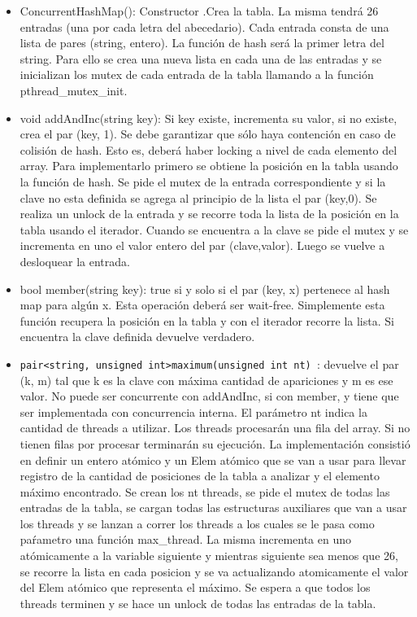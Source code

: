 \documentclass[a4paper]{article}
\begin{document}
{\begin{itemize}

\item ConcurrentHashMap(): Constructor .Crea la tabla. La misma tendrá 26 entradas (una por
cada letra del abecedario). Cada entrada consta de una lista de pares (string, entero). La
función de hash será la primer letra del string. Para ello se crea una nueva lista en cada una de las entradas y se inicializan los mutex de cada entrada de la tabla llamando a la función pthread_mutex_init.\blindtext
\item void addAndInc(string key): Si key existe, incrementa su valor, si no existe, crea el par
(key, 1). Se debe garantizar que sólo haya contención en caso de colisión de hash. Esto es,
deberá haber locking a nivel de cada elemento del array. Para implementarlo primero se obtiene la posición en la tabla usando la función de hash. Se pide el mutex de la entrada correspondiente y si la clave no esta definida se agrega al principio de la lista el par (key,0). Se realiza un unlock de la entrada y se recorre toda la lista de la posición en la tabla usando el iterador. Cuando se encuentra a la clave se pide el mutex y se incrementa en uno el valor entero del par (clave,valor). Luego se vuelve a desloquear la entrada.\blindtext
\item bool member(string key): true si y solo si el par (key, x) pertenece al hash map para algún
x. Esta operación deberá ser wait-free. Simplemente esta función recupera la posición en la tabla y con el iterador recorre la lista. Si encuentra la clave definida devuelve verdadero. 
\item {\tt pair<string, unsigned int>maximum(unsigned int nt) }: devuelve el par (k, m) tal que
k es la clave con máxima cantidad de apariciones y m es ese valor. No puede ser concurrente
con addAndInc, si con member, y tiene que ser implementada con concurrencia interna. El
parámetro nt indica la cantidad de threads a utilizar. Los threads procesarán una fila del
array. Si no tienen filas por procesar terminarán su ejecución. La implementación consistió en definir un entero atómico y un Elem atómico que se van a usar para llevar registro de la cantidad de posiciones de la tabla a analizar y el elemento máximo encontrado. Se crean los nt threads, se pide el mutex de todas las entradas de la tabla, se cargan todas las estructuras auxiliares que van a usar los threads y se lanzan a correr los threads a los cuales se le pasa como paŕametro una función max_thread. La misma incrementa en uno atómicamente a la variable siguiente y mientras siguiente sea menos que 26, se recorre la lista en cada posicion y se va actualizando atomicamente el valor del Elem atómico que representa el máximo. Se espera a que todos los threads terminen y se hace un unlock de todas las entradas de la tabla.


\end{itemize}}
\end{document}
